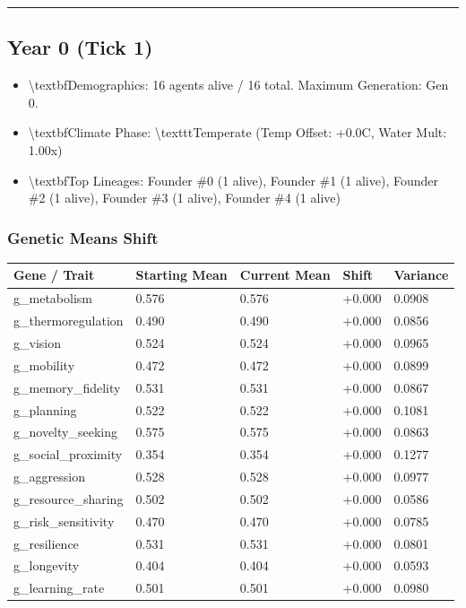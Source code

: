 \documentclass[11pt,a4paper]{article}
\begin{document}
\noindent\rule{\textwidth}{0.4pt}

\subsection*{ Year 0 (Tick 1)}
\begin{itemize}
  \item \textbackslash{}textbf{Demographics:} 16 agents alive / 16 total. Maximum Generation: Gen 0.
  \item \textbackslash{}textbf{Climate Phase:} \textbackslash{}texttt{Temperate} (Temp Offset: +0.0C, Water Mult: 1.00x)
  \item \textbackslash{}textbf{Top Lineages:} Founder \#0 (1 alive), Founder \#1 (1 alive), Founder \#2 (1 alive), Founder \#3 (1 alive), Founder \#4 (1 alive)
\end{itemize}

\subsubsection*{ Genetic Means Shift}
\begin{longtable}{lllll}
\toprule
Gene / Trait & Starting Mean & Current Mean & Shift & Variance \\
\midrule
\endhead
g\_metabolism & 0.576 & 0.576 & +0.000 & 0.0908 \\
g\_thermoregulation & 0.490 & 0.490 & +0.000 & 0.0856 \\
g\_vision & 0.524 & 0.524 & +0.000 & 0.0965 \\
g\_mobility & 0.472 & 0.472 & +0.000 & 0.0899 \\
g\_memory\_fidelity & 0.531 & 0.531 & +0.000 & 0.0867 \\
g\_planning & 0.522 & 0.522 & +0.000 & 0.1081 \\
g\_novelty\_seeking & 0.575 & 0.575 & +0.000 & 0.0863 \\
g\_social\_proximity & 0.354 & 0.354 & +0.000 & 0.1277 \\
g\_aggression & 0.528 & 0.528 & +0.000 & 0.0977 \\
g\_resource\_sharing & 0.502 & 0.502 & +0.000 & 0.0586 \\
g\_risk\_sensitivity & 0.470 & 0.470 & +0.000 & 0.0785 \\
g\_resilience & 0.531 & 0.531 & +0.000 & 0.0801 \\
g\_longevity & 0.404 & 0.404 & +0.000 & 0.0593 \\
g\_learning\_rate & 0.501 & 0.501 & +0.000 & 0.0980 \\
\bottomrule
\end{longtable}
\end{document}
